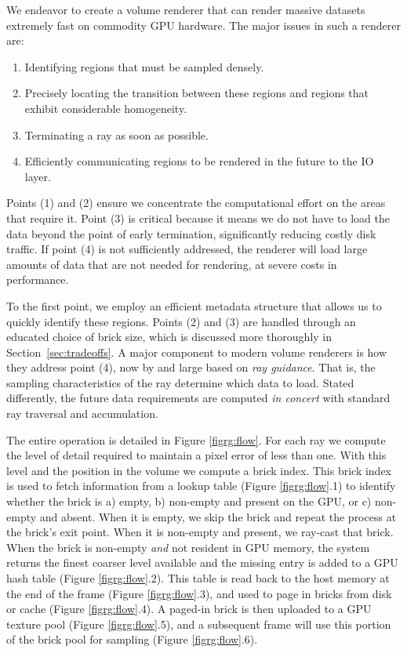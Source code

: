 We endeavor to create a volume renderer that can render massive 
datasets extremely fast on commodity GPU hardware.  The major issues in
such a renderer are:
\begin{enumerate}
  \itemsep0em
  \item Identifying regions that must be sampled densely.

  \item Precisely locating the transition between these regions and
  regions that exhibit considerable homogeneity.

  \item Terminating a ray as soon as possible.

  \item Efficiently communicating regions to be rendered in the future
  to the IO layer.

\end{enumerate}

Points (1) and (2) ensure we concentrate the computational effort on
the areas that require it.  Point (3) is critical because it means we
do not have to load the data beyond the point of early termination,
significantly reducing costly disk traffic.  If point (4) is not
sufficiently addressed, the renderer will load large amounts of data
that are not needed for rendering, at severe costs in performance.


To the first point, we employ an efficient metadata structure that
allows us to quickly identify these regions.  Points (2) and (3) are
handled through an educated choice of brick size, which is discussed
more thoroughly in Section~\ref{sec:tradeoffs}.  A major component to
modern volume renderers is how they address point (4), now by and large
based on \emph{ray guidance}.  That is, the sampling characteristics of
the ray determine which data to load.  Stated differently, the future
data requirements are computed \emph{in concert} with standard ray
traversal and accumulation.

The entire operation is detailed in Figure \ref{figrg:flow}. For each
ray we compute the level of detail required to maintain a pixel error
of less than one. With this level and the position in the volume we
compute a brick index.  This brick index is used to fetch information
from a lookup table
(Figure \ref{figrg:flow}.1) to identify whether the brick is a) empty, b)
non-empty and present on the GPU, or c) non-empty and absent. When it
is empty, we skip the brick and repeat the process at the brick's exit
point.  When it is non-empty and present, we ray-cast that brick. When
the brick is non-empty \emph{and} not resident in GPU memory, the
system returns the finest coarser level available and the missing entry
is added to a GPU hash table (Figure
\ref{figrg:flow}.2). This table is read back to the host memory at the
end of the frame (Figure \ref{figrg:flow}.3), and used to page in bricks
from
disk or cache (Figure \ref{figrg:flow}.4).  A paged-in brick is then
uploaded to a GPU texture pool
(Figure \ref{figrg:flow}.5), and a subsequent frame will use this
portion of the brick pool for sampling (Figure \ref{figrg:flow}.6).

